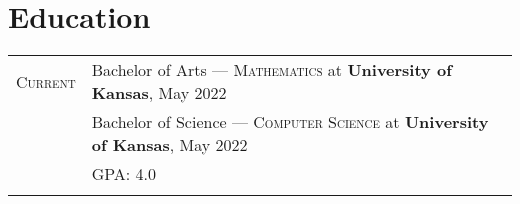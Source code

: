 \documentclass[letterpaper,10pt]{article}
\begin{document}
\section{Education}
\begin{tabular}{rl}

  \textsc{Current} & Bachelor of Arts --- \textsc{Mathematics} at \normalsize\textbf{University of Kansas}, May 2022\\
  & Bachelor of Science --- \textsc{Computer Science} at \normalsize\textbf{University of Kansas}, May 2022\\
  &\textsc{GPA}: 4.0\\
  \\
  
\end{tabular}
\end{document}
